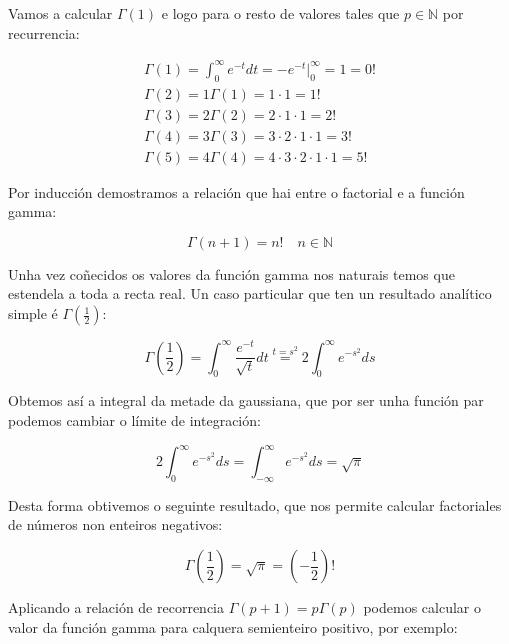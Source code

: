 \documentclass[a4paper,12pt,titlepage]{article}
\begin{document}
Vamos a calcular $\Gamma(1)$ e logo para o resto de valores tales que $p\in \mathbb{N}$ por recurrencia:

\begin{equation*}
    \begin{array}{l}
        \Gamma(1) = \int_0^{\infty} e^{-t}dt = -e^{-t}\Big|_0^{\infty} = 1 = 0! \\
        \Gamma(2) =1\Gamma(1)=1\cdot1=1!\\
        \Gamma(3) =2 \Gamma(2) = 2\cdot 1 \cdot 1 = 2!\\
        \Gamma(4) = 3\Gamma(3) = 3 \cdot 2\cdot 1 \cdot 1 = 3! \\
        \Gamma(5) = 4\Gamma(4) = 4 \cdot3 \cdot 2\cdot 1 \cdot 1 = 5!
    \end{array}
\end{equation*}

Por inducción demostramos a relación que hai entre o factorial e a función gamma:

\begin{equation*}
    \Gamma(n+1)=n! \quad n\in\mathbb{N}
\end{equation*}

Unha vez coñecidos os valores da función gamma nos naturais temos que estendela a toda a recta real. Un caso particular que ten un resultado analítico simple é $\Gamma(\frac{1}{2})$:

\begin{equation*}
    \Gamma\left (\frac{1}{2}\right ) = \int_0^{\infty} \frac{e^{-t}}{\sqrt{t}}dt \overset{t = s^2}{=} 2\int_0^{\infty} e^{-s^2} ds
\end{equation*}

\newpage

Obtemos así a integral da metade da gaussiana, que por ser unha función par podemos cambiar o límite de integración:

\begin{equation*}
    2\int_0^{\infty} e^{-s^2} ds = \int_{-\infty}^{\infty} e^{-s^2} ds = \sqrt{\pi}
\end{equation*}

Desta forma obtivemos o seguinte resultado, que nos permite calcular factoriales de números non enteiros negativos:

\begin{equation*}
    \Gamma \left (\frac{1}{2}\right ) = \sqrt{\pi} = \left (-\frac{1}{2}\right )!
\end{equation*}

Aplicando a relación de recorrencia $\Gamma(p+1) = p\Gamma(p)$ podemos calcular o valor da función gamma para calquera semienteiro positivo, por exemplo:
\end{document}
